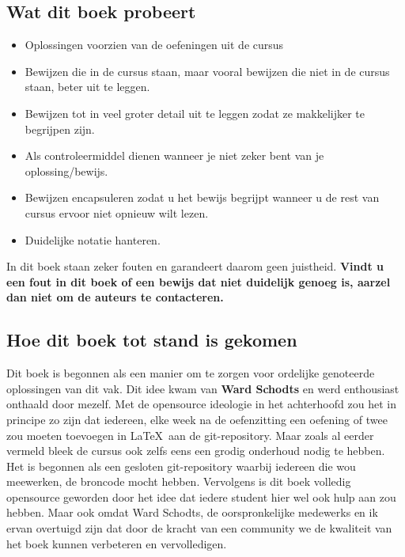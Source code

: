 \documentclass[lineaire_algebra_oplossingen.tex]{subfiles}
\begin{document}
\subsection*{Wat dit boek probeert}
\begin{itemize}
\item Oplossingen voorzien van de oefeningen uit de cursus
\item Bewijzen die in de cursus staan, maar vooral bewijzen die niet in de cursus staan, beter uit te leggen.
\item Bewijzen tot in veel groter detail uit te leggen zodat ze makkelijker te begrijpen zijn. 
\item Als controleermiddel dienen wanneer je niet zeker bent van je oplossing/bewijs.
\item Bewijzen encapsuleren zodat u het bewijs begrijpt wanneer u de rest van cursus ervoor niet opnieuw wilt lezen. 
\item Duidelijke notatie hanteren.
\end{itemize}
In dit boek staan zeker fouten en garandeert daarom geen juistheid.
\textbf{Vindt u een fout in dit boek of een bewijs dat niet duidelijk genoeg is, aarzel dan niet om de auteurs te contacteren.}
\subsection*{Hoe dit boek tot stand is gekomen}
Dit boek is begonnen als een manier om te zorgen voor ordelijke genoteerde oplossingen van dit vak. Dit idee kwam van \textbf{Ward Schodts} en werd enthousiast onthaald door mezelf. Met de opensource ideologie in het achterhoofd zou het in principe zo zijn dat iedereen, elke week na de oefenzitting een oefening of twee zou moeten toevoegen in \LaTeX \ aan de git-repository. Maar zoals al eerder vermeld bleek de cursus ook zelfs eens een grodig onderhoud nodig te hebben. Het is begonnen als een gesloten git-repository waarbij iedereen die wou meewerken, de broncode mocht hebben. Vervolgens is dit boek volledig opensource geworden door het idee dat iedere student hier wel ook hulp aan zou hebben. Maar ook omdat Ward Schodts, de oorspronkelijke medewerks en ik ervan overtuigd zijn dat door de kracht van een community we de kwaliteit van het boek kunnen verbeteren en vervolledigen.
\end{document}
